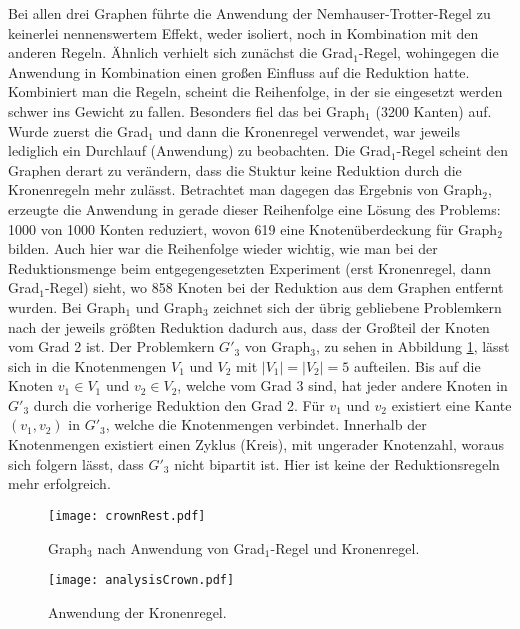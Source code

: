 Bei allen drei Graphen führte die Anwendung der Nemhauser-Trotter-Regel zu keinerlei nennenswertem Effekt, weder isoliert, noch in Kombination mit den anderen Regeln. Ähnlich verhielt sich zunächst die Grad$_{1}$-Regel, wohingegen die Anwendung in Kombination einen großen Einfluss auf die Reduktion hatte. Kombiniert man die Regeln, scheint die Reihenfolge, in der sie eingesetzt werden schwer ins Gewicht zu fallen. Besonders fiel das bei Graph$_{1}$ (3200 Kanten) auf. Wurde zuerst die Grad$_{1}$ und dann die Kronenregel verwendet, war jeweils lediglich ein Durchlauf (Anwendung) zu beobachten. Die Grad$_{1}$-Regel scheint den Graphen derart zu verändern, dass die Stuktur keine Reduktion durch die Kronenregeln mehr zulässt. Betrachtet man dagegen das Ergebnis von Graph$_{2}$, erzeugte die Anwendung in gerade dieser Reihenfolge eine Lösung des Problems: 1000 von 1000 Konten reduziert, wovon 619 eine Knotenüberdeckung für Graph$_{2}$ bilden. Auch hier war die Reihenfolge wieder wichtig, wie man bei der Reduktionsmenge beim entgegengesetzten Experiment (erst Kronenregel, dann Grad$_{1}$-Regel) sieht, wo 858 Knoten bei der Reduktion aus dem Graphen entfernt wurden. Bei Graph$_{1}$ und Graph$_{3}$ zeichnet sich der übrig gebliebene Problemkern nach der jeweils größten Reduktion dadurch aus, dass der Großteil der Knoten vom Grad 2 ist. Der Problemkern $G'_{3}$ von Graph$_{3}$, zu sehen in  Abbildung \ref{fig:crownRest}, lässt sich in die Knotenmengen $V_{1}$ und $V_{2}$  mit $|V_{1}| = |V_{2}| = 5$ aufteilen. Bis auf die Knoten $v_{1} \in V_{1}$ und $v_{2} \in V_{2}$, welche vom Grad 3 sind, hat jeder andere Knoten in  $G'_{3}$ durch die vorherige Reduktion den Grad 2. Für  $v_{1}$ und $v_{2}$ existiert eine Kante $(v_{1}, v_{2})$ in $G'_{3}$, welche die Knotenmengen verbindet. Innerhalb der Knotenmengen existiert einen Zyklus (Kreis), mit ungerader Knotenzahl, woraus sich folgern lässt, dass $G'_{3}$ nicht bipartit ist. Hier ist keine der Reduktionsregeln mehr erfolgreich.
\begin{figure}[htb]
\centering
  	{\texttt{[image: crownRest.pdf]}}
	\caption{Graph$_{3}$ nach Anwendung von Grad$_{1}$-Regel und Kronenregel.\label{fig:crownRest}}
\centering
\end{figure}
\begin{figure}[htb]
\centering
  	{\texttt{[image: analysisCrown.pdf]}}
	\caption{Anwendung der Kronenregel.\label{fig:crown}}
\centering
\end{figure}

